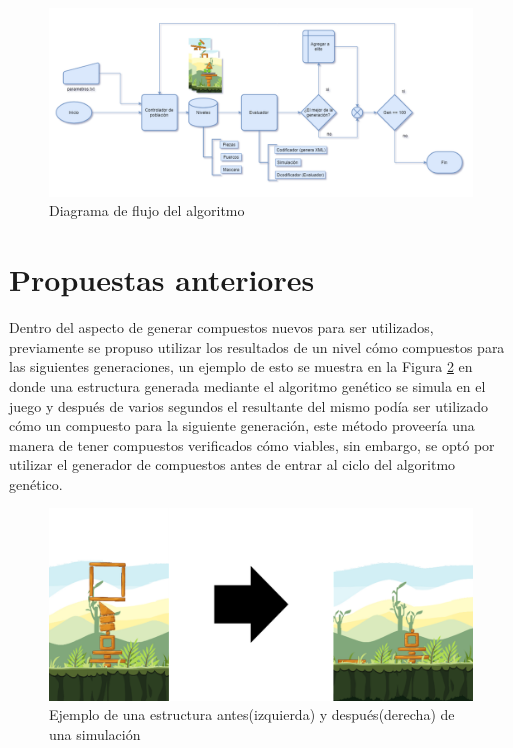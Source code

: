 \begin{figure}
  \centering
  \includegraphics[width=1.0\textwidth]{img/system_model.png}
  \caption{Diagrama de flujo del algoritmo}
  \label{figure:algorithm_model}
\end{figure}

\section{Propuestas anteriores}
\label{section:previous-proposed-methods}

Dentro del aspecto de generar compuestos nuevos para ser utilizados, previamente
se propuso utilizar los resultados de un nivel cómo compuestos para las
siguientes generaciones, un ejemplo de esto se muestra en la Figura
\ref{figure:prev_composite_proposal_bef_aft} en donde una estructura generada
mediante el algoritmo genético se simula en el juego y después de varios
segundos el resultante del mismo podía ser utilizado cómo un compuesto para la
siguiente generación, este método proveería una manera de tener compuestos
verificados cómo viables, sin embargo, se optó por utilizar el generador de
compuestos antes de entrar al ciclo del algoritmo genético.

\begin{figure}
  \centering
  \includegraphics[width=1.0\textwidth]{img/simulation_bef_aft_example.png}
  \caption{Ejemplo de una estructura antes(izquierda) y después(derecha) de una simulación}
  \label{figure:prev_composite_proposal_bef_aft}
\end{figure}


